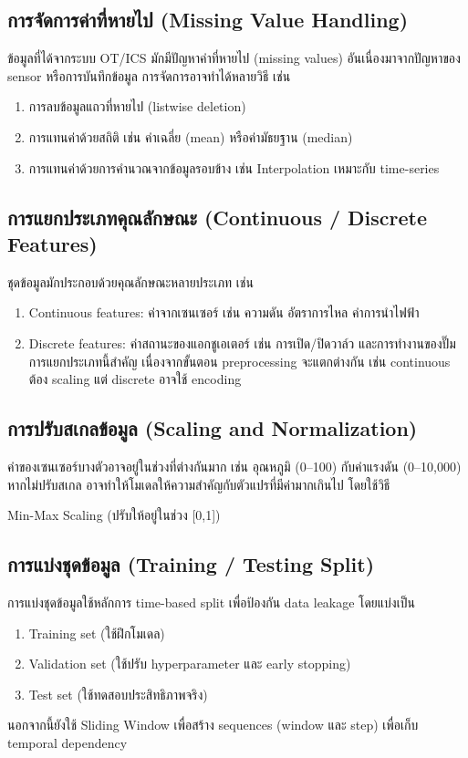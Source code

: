 \subsection{การจัดการค่าที่หายไป (Missing Value Handling)}
\hspace{2em} ข้อมูลที่ได้จากระบบ OT/ICS มักมีปัญหาค่าที่หายไป (missing values) อันเนื่องมาจากปัญหาของ sensor หรือการบันทึกข้อมูล การจัดการอาจทำได้หลายวิธี เช่น
\begin{enumerate}
  \item การลบข้อมูลแถวที่หายไป (listwise deletion)
  \item การแทนค่าด้วยสถิติ เช่น ค่าเฉลี่ย (mean) หรือค่ามัธยฐาน (median)
  \item การแทนค่าด้วยการคำนวณจากข้อมูลรอบข้าง เช่น Interpolation เหมาะกับ time-series
\end{enumerate}

\subsection{การแยกประเภทคุณลักษณะ (Continuous / Discrete Features)}
\hspace{2em} ชุดข้อมูลมักประกอบด้วยคุณลักษณะหลายประเภท เช่น
\begin{enumerate}
  \item Continuous features: ค่าจากเซนเซอร์ เช่น ความดัน อัตราการไหล ค่าการนำไฟฟ้า
  \item Discrete features: ค่าสถานะของแอกชูเอเตอร์ เช่น การเปิด/ปิดวาล์ว และการทำงานของปั๊ม
 การแยกประเภทนี้สำคัญ เนื่องจากขั้นตอน preprocessing จะแตกต่างกัน เช่น continuous ต้อง scaling แต่ discrete อาจใช้ encoding
\end{enumerate}

\subsection{การปรับสเกลข้อมูล (Scaling and Normalization)}
\hspace{2em} ค่าของเซนเซอร์บางตัวอาจอยู่ในช่วงที่ต่างกันมาก เช่น อุณหภูมิ (0–100) กับค่าแรงดัน (0–10,000) หากไม่ปรับสเกล อาจทำให้โมเดลให้ความสำคัญกับตัวแปรที่มีค่ามากเกินไป โดยใช้วิธี
\begin{center}
  Min-Max Scaling (ปรับให้อยู่ในช่วง [0,1])
\end{center}

\subsection{การแบ่งชุดข้อมูล (Training / Testing Split)}
\hspace{2em} การแบ่งชุดข้อมูลใช้หลักการ time-based split เพื่อป้องกัน data leakage โดยแบ่งเป็น
\begin{enumerate}
  \item Training set (ใช้ฝึกโมเดล)
  \item Validation set (ใช้ปรับ hyperparameter และ early stopping)
  \item Test set (ใช้ทดสอบประสิทธิภาพจริง)
\end{enumerate}
นอกจากนี้ยังใช้ Sliding Window เพื่อสร้าง sequences (window และ step) เพื่อเก็บ temporal dependency

